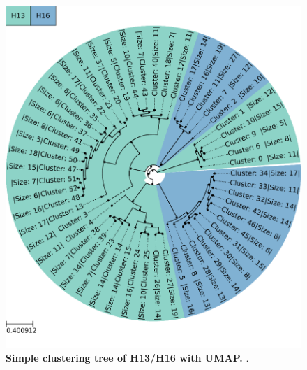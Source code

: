 





\FloatBarrier
\newpage

\begin{figure}[!hbt]
    \centering
    \includegraphics[width=\textwidth]{UMAP/Clustertree_Segment_4_H_Simple.pdf}
    \caption[Simple clustering tree of H13/H16 with UMAP]{\textbf{Simple clustering tree of H13/H16 with UMAP.} .}
    \label{fig:Simple_Clustertree_UMAP}
\end{figure}

